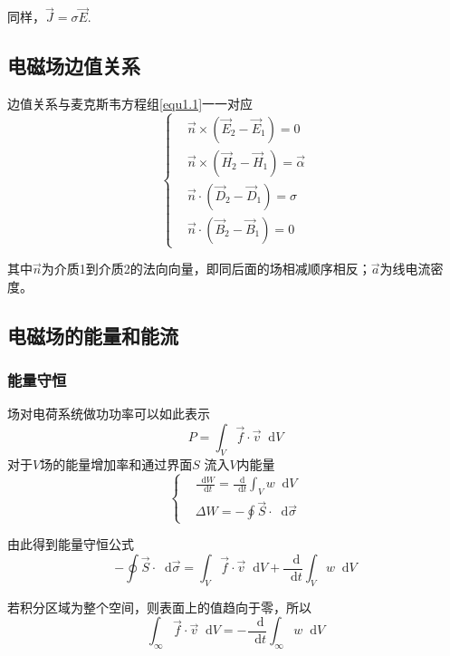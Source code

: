 \documentclass[UTF8]{ctexart}
\newcommand*{\dif}{\mathop{}\!\mathrm{d}}
\begin{document}
\noindent 同样，$\vec{J} = \sigma \vec{E}$.

    \subsection{电磁场边值关系}
    边值关系与麦克斯韦方程组\autoref{equ1.1}一一对应
    \begin{equation}
        \left \{ \begin{aligned}
            &\vec{n} \times\left(\vec{E}_{2}-\vec{E}_{1}\right)=0 \\ &\vec{n} \times\left(\vec{H}_{2}-\vec{H}_{1}\right)=\vec{\alpha} \\ &\vec{n} \cdot\left(\vec{D}_{2}-\vec{D}_{1}\right)=\sigma \\ &\vec{n} \cdot\left(\vec{B}_{2}-\vec{B}_{1}\right)=0
        \end{aligned} \right.
    \end{equation}

\noindent 其中$\vec{n}$为介质1到介质2的法向向量，即同后面的场相减顺序相反；$\vec{a}$为线电流密度。

    \subsection{电磁场的能量和能流}
    \subsubsection{能量守恒}
    场对电荷系统做功功率可以如此表示
    \begin{equation}
        P = \int_V \vec{f} \cdot \vec{v} \dif V
    \end{equation}
\noindent 对于$V$场的能量增加率和通过界面$S$ 流入$V$内能量
\begin{equation}
    \left \{ \begin{aligned}
        &\frac{\dif W}{\dif t} = \frac{\dif}{\dif t}\int_V w \dif V \\
        &\Delta W = - \oint \vec{S} \cdot \dif \vec{\sigma}
    \end{aligned} \right.
\end{equation}

\noindent 由此得到能量守恒公式
\begin{equation}
    -  \oint \vec{S} \cdot \dif \vec{\sigma} = \int_V \vec{f} \cdot \vec{v} \dif V+ \frac{\dif}{\dif t}\int_V w \dif V
\end{equation}

\noindent 若积分区域为整个空间，则表面上的值趋向于零，所以
\begin{equation}
    \int_{\infty} \vec{f} \cdot \vec{v} \dif V = - \frac{\dif }{\dif t} \int_{\infty} w \dif V
\end{equation}
\end{document}
